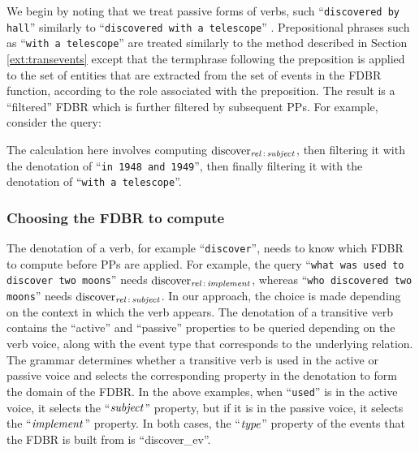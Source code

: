 \documentclass[../main.tex]{subfiles}
\begin{document}
\begin{refsection}
We begin by noting that we treat passive forms of verbs, such ``\texttt{discovered by hall}'' similarly to
``\texttt{discovered with a telescope}'' \cite{peelar2016accommodating}. Prepositional phrases such as ``\texttt{with a telescope}'' are treated similarly to the method described in Section \ref{ext:transevents} except that
the termphrase following the preposition is applied to the set of entities that are extracted
from the set of events in the FDBR function, according to the role associated with the preposition. The
result is a ``filtered'' FDBR which is further filtered by subsequent PPs. For
example, consider the query:


The calculation here involves computing $\operatorname{discover}_{\operatorname{\mathit{rel}}\,:\,\operatorname{\mathit{subject}}}$, then filtering it with the denotation of ``\texttt{in 1948 and 1949}'', then finally filtering it with the denotation of ``\texttt{with a telescope}''. %

\subsubsection{Choosing the FDBR to compute}
\label{ext:choosingfdbr}

The denotation of a verb, for example ``\texttt{discover}'', needs to know which FDBR to compute
before PPs are applied. For example, the query ``\texttt{what was used to discover
two moons}'' needs $\operatorname{discover}_{\operatorname{\mathit{rel}}\,:\,\operatorname{\mathit{implement}}}$, whereas ``\texttt{who discovered two moons}'' needs
$\operatorname{discover}_{\operatorname{\mathit{rel}}\,:\,\operatorname{\mathit{subject}}}$. In our approach, the choice is made depending on the context in
which the verb appears. The denotation of a transitive verb contains the ``active'' and ``passive'' properties to be queried depending
on the verb voice, along with the event type that corresponds to the underlying relation. The grammar determines whether a transitive verb is used in the active or passive voice and selects the corresponding property in the denotation to form the domain of the FDBR. In the above examples, when ``\texttt{used}'' is in the active voice, it selects the ``$\operatorname{\mathit{subject}}$'' property, but if it is in the passive voice, it selects the ``$\operatorname{\mathit{implement}}$'' property. In both cases, the ``$\operatorname{\mathit{type}}$'' property of the events that the FDBR is built from is ``discover\_ev''.


\end{refsection}
\end{document}
